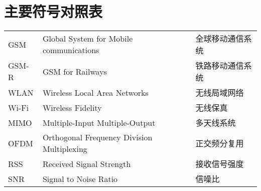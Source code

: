 
\chapter{主要符号对照表}
\label{chap:symb}

\noindent
\begin{supertabular}{lll}
GSM         & \hspace{0.5em}Global System for Mobile communications   & \hspace{0.5em}全球移动通信系统 \\
GSM-R       & \hspace{0.5em}GSM for Railways                          & \hspace{0.5em}铁路移动通信系统 \\
WLAN        & \hspace{0.5em}Wireless Local Area Networks              & \hspace{0.5em}无线局域网络 \\
Wi-Fi       & \hspace{0.5em}Wireless Fidelity                         & \hspace{0.5em}无线保真 \\
MIMO        & \hspace{0.5em}Multiple-Input Multiple-Output            & \hspace{0.5em}多天线系统 \\
OFDM        & \hspace{0.5em}Orthogonal Frequency Division Multiplexing& \hspace{0.5em}正交频分复用 \\
RSS         & \hspace{0.5em}Received Signal Strength                  & \hspace{0.5em}接收信号强度 \\
SNR         & \hspace{0.5em}Signal to Noise Ratio                     & \hspace{0.5em}信噪比 \\

\end{supertabular}
